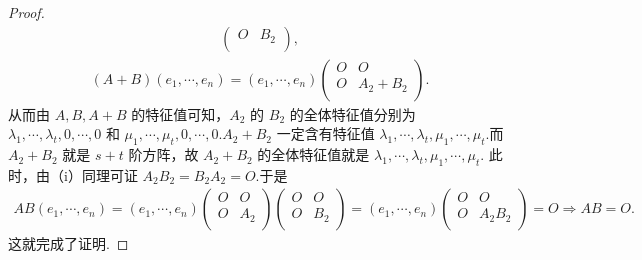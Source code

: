 \documentclass[../../main.tex]{subfiles}
\begin{document}
\begin{proof}
\begin{align*}
\begin{pmatrix}
O&		B_2\\
\end{pmatrix},
\end{align*}
\begin{align*}
\left( A+B \right) \left( e_1,\cdots ,e_n \right) =\left( e_1,\cdots ,e_n \right) \begin{pmatrix}
O&		O\\
O&		A_2+B_2\\
\end{pmatrix}.
\end{align*}
从而由 $A,B,A+B$ 的特征值可知，$A_2$ 的 $B_2$ 的全体特征值分别为 $\lambda _1,\cdots ,\lambda _t,0,\cdots ,0$ 和 $\mu _1,\cdots ,\mu _t,0,\cdots ,0$.$A_2+B_2$ 一定含有特征值 $\lambda _1,\cdots ,\lambda _t,\mu _1,\cdots ,\mu _t$.而 $A_2+B_2$ 就是 $s+t$ 阶方阵，故 $A_2+B_2$ 的全体特征值就是 $\lambda _1,\cdots ,\lambda _t,\mu _1,\cdots ,\mu _t$.
此时，由（i）同理可证 $A_2B_2=B_2A_2=O$.于是
\begin{align*}
AB\left( e_1,\cdots ,e_n \right) =\left( e_1,\cdots ,e_n \right) \begin{pmatrix}
O&		O\\
O&		A_2\\
\end{pmatrix} \begin{pmatrix}
O&		O\\
O&		B_2\\
\end{pmatrix} =\left( e_1,\cdots ,e_n \right) \begin{pmatrix}
O&		O\\
O&		A_2B_2\\
\end{pmatrix} =O\Rightarrow AB=O.
\end{align*}
这就完成了证明.

\end{proof}
\end{document}
